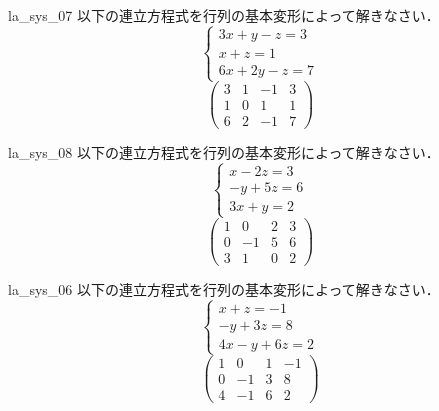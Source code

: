 
\begin{question}{la_sys_07}
以下の連立方程式を行列の基本変形によって解きなさい．
\[
 \begin{cases}
 3x + y - z =3\\
 x + z = 1\\
 6x + 2y -z = 7
\end{cases}
\]
\[
\begin{pmatrix}
 3 & 1 & -1 & 3\\
 1 & 0 & 1 & 1\\
 6 & 2 & -1 & 7
\end{pmatrix}
\]
\end{question}

\begin{question}{la_sys_08}
以下の連立方程式を行列の基本変形によって解きなさい．
\[
 \begin{cases}
 x - 2z =3\\
 -y + 5z = 6\\
 3x + y = 2
\end{cases}
\]
\[
\begin{pmatrix}
 1 & 0 & 2 & 3\\
 0 & -1 & 5 & 6\\
 3 & 1 & 0 & 2
\end{pmatrix}
\]
\end{question}

\begin{question}{la_sys_06}
以下の連立方程式を行列の基本変形によって解きなさい．
\[
\begin{cases}
 x + z = -1\\
 -y + 3z = 8\\
 4x -y + 6z = 2
\end{cases}
\]
\[
 \begin{pmatrix}
 1 & 0 & 1 & -1\\
 0 & -1 & 3 & 8\\
 4 & -1 & 6 & 2
\end{pmatrix}
\]
 \end{question}